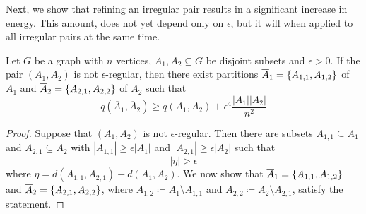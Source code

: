         Next, we show that refining an irregular pair results in a significant increase in energy.
        This amount, does not yet depend only on $\epsilon$, but it will when applied to all irregular pairs
        at the same time.
        \begin{lemma} \label{lem:increase_in_energy_when_refining_an_irregular_pair}
            Let $G$ be a graph with $n$ vertices, $A_1, A_2 \subseteq G$ be disjoint subsets and $\epsilon > 0$.
            If the pair $(A_1, A_2)$ is not $\epsilon$-regular, then there exist partitions
            $\overline{A}_1 = \{ A_{1,1}, A_{1,2} \}$ of $A_1$ and
            $\overline{A}_2 = \{ A_{2,1}, A_{2,2} \}$ of $A_2$ such that
            \[
                q(\overline{A}_1, \overline{A}_2) \geq q(A_1, A_2) + \epsilon^4 \frac{|A_1||A_2|}{n^2}
            \]
            \begin{proof}
                Suppose that $(A_1, A_2)$ is not $\epsilon$-regular.
                Then there are subsets $A_{1,1} \subseteq A_1$ and $A_{2,1} \subseteq A_2$ with
                $|A_{1,1}| \geq \epsilon |A_1|$ and $|A_{2,1}| \geq \epsilon |A_2|$ such that
                \begin{equation} \label{eq:irregular_pair_density_difference}
                    |\eta| > \epsilon
                \end{equation}
                where $\eta = d(A_{1,1}, A_{2,1}) - d(A_1, A_2)$.
                We now show that $\overline{A}_1 = \{ A_{1,1}, A_{1,2} \}$ and
                $\overline{A}_2 = \{ A_{2,1}, A_{2,2} \}$, where $A_{1,2} \coloneqq A_1 \setminus A_{1,1}$ and
                $A_{2,2} \coloneqq A_2 \setminus A_{2,1}$, satisfy the statement.


\end{proof}
\end{lemma}
